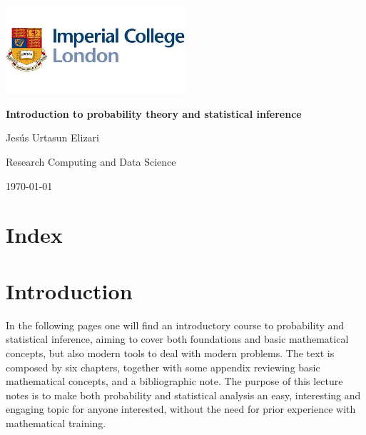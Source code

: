 \documentclass{book}
\begin{document}

\frontmatter

\begin{titlepage}
    \centering
    \includegraphics[width=0.5\textwidth]{figures/icl_logo.jpeg} 
    \vfill
    {\Huge\bfseries Introduction to probability theory and statistical inference\par}
    \vspace{1cm}
    {\Large Jes\'us Urtasun Elizari\par}
    \vspace{1cm}
     {\Large Research Computing and Data Science\par}
    \vspace{1cm}
    {\large\today\par}
    \vspace*{\fill}
\end{titlepage}

\tableofcontents

\chapter*{Index}
\clearpage
\printindex

\mainmatter


\chapter{Introduction}

\indent In the following pages one will find an introductory course to probability and statistical inference, aiming to cover both foundations and basic mathematical concepts, but also modern tools to deal with modern problems. The text is composed by six chapters, together with some appendix reviewing basic mathematical concepts, and a bibliographic note. The purpose of this lecture notes is to make both probability and statistical analysis an easy, interesting and engaging topic for anyone interested, without the need for prior experience with mathematical training.\\
\end{document}
